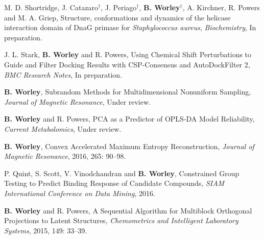 \documentclass[letterpaper]{article}
\renewenvironment{itemize}{
  \begin{list}{}{
    \setlength{\leftmargin}{1.5em}
  }
}{
  \end{list}
}
\begin{document}
\begin{itemize}
\item M. D. Shortridge, J. Catazaro$^\dagger$, J. Periago$^\dagger$,
 \textbf{B. Worley}$^\dagger$, A. Kirchner, R. Powers and M. A. Griep,
 Structure, conformations and dynamics of the helicase interaction
 domain of DnaG primase for {\it Staphylococcus aureus},
 {\it Biochemistry}, In preparation.
\end{itemize}

\begin{itemize}
\item J. L. Stark, \textbf{B. Worley} and R. Powers,
 Using Chemical Shift Perturbations to Guide and Filter Docking Results
 with CSP-Consensus and AutoDockFilter 2,
 {\it BMC Research Notes}, In preparation.
\end{itemize}

\begin{itemize}
\item \textbf{B. Worley},
 Subrandom Methods for Multidimensional Nonuniform Sampling,
 {\it Journal of Magnetic Resonance}, Under review.
\end{itemize}

\begin{itemize}
\item \textbf{B. Worley} and R. Powers,
 PCA as a Predictor of OPLS-DA Model Reliability,
 {\it Current Metabolomics}, Under review.
\end{itemize}

\begin{itemize}
\item \textbf{B. Worley},
 Convex Accelerated Maximum Entropy Reconstruction,
 {\it Journal of Magnetic Resonance},
 2016, 265: 90--98.
\end{itemize}

\begin{itemize}
\item P. Quint, S. Scott, V. Vinodchandran and \textbf{B. Worley},
 Constrained Group Testing to Predict Binding
 Response of Candidate Compounds,
 {\it SIAM International Conference on Data Mining}, 2016.
\end{itemize}

\begin{itemize}
\item \textbf{B. Worley} and R. Powers,
 A Sequential Algorithm for Multiblock Orthogonal
 Projections to Latent Structures,
 {\it Chemometrics and Intelligent Laboratory Systems},
 2015, 149: 33--39.
\end{itemize}
\end{document}
